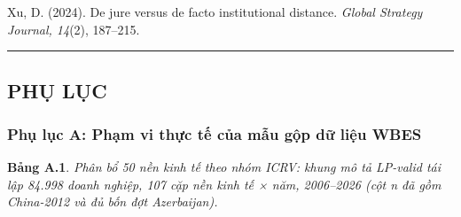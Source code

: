 \documentclass[
  a4paper,
  13pt]{extreport}
\begin{document}
Xu, D. (2024). De jure versus de facto institutional distance.
\emph{Global Strategy Journal, 14}(2), 187--215.

\begin{center}\rule{0.5\linewidth}{0.5pt}\end{center}

\hypertarget{phux1ee5-lux1ee5c}{%
\subsection{PHỤ LỤC}\label{phux1ee5-lux1ee5c}}

\hypertarget{phux1ee5-lux1ee5c-a-phux1ea1m-vi-thux1ef1c-tux1ebf-cux1ee7a-mux1eabu-gux1ed9p-dux1eef-liux1ec7u-wbes}{%
\subsubsection{Phụ lục A: Phạm vi thực tế của mẫu gộp dữ liệu
WBES}\label{phux1ee5-lux1ee5c-a-phux1ea1m-vi-thux1ef1c-tux1ebf-cux1ee7a-mux1eabu-gux1ed9p-dux1eef-liux1ec7u-wbes}}

\textbf{Bảng A.1}. \emph{Phân bổ 50 nền kinh tế theo nhóm ICRV: khung mô
tả LP-valid tái lập 84.998 doanh nghiệp, 107 cặp nền kinh tế × năm,
2006--2026 (cột n đã gồm China-2012 và đủ bốn đợt Azerbaijan).}
\end{document}
